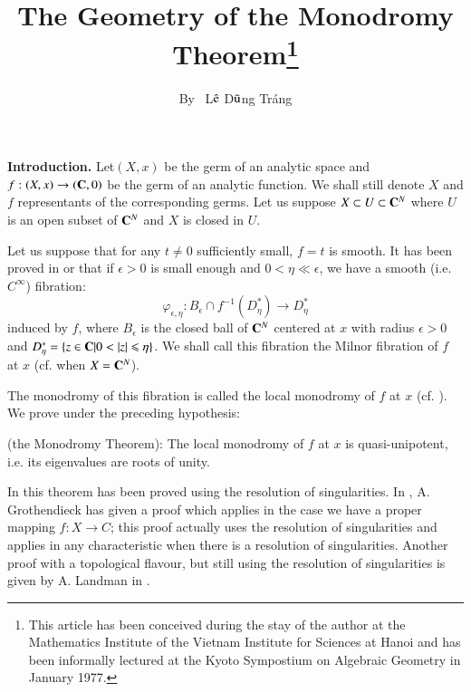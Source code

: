 \title{The Geometry of the Monodromy Theorem\footnote{This article has been conceived during the stay of the author at the Mathematics Institute of the Vietnam Institute for Sciences at Hanoi and has been informally lectured at the Kyoto Sympostium on Algebraic Geometry in January 1977.}}\label{art15}


\author{By~ L$\hat{\rm e}$ D$\tilde{\rm u}$ng Tr\'ang}

\date{}
\maketitle{}

\setcounter{page}{191}

{\bf Introduction.}
\setcounter{pageoriginal}{156} Let\pageoriginale $(X,x)$ be the germ of an analytic space and $f:(X,x) \to (\mathbf{C}, 0)$ be the germ of an analytic function. We shall still denote $X$ and $f$ representants of the corresponding germs. Let us suppose $X \subset U \subset \mathbf{C}^N$ where $U$ is an open subset of $\mathbf{C}^N$ and $X$ is closed in $U$.

Let us suppose that for any $t \neq 0$ sufficiently small, $f = t$ is smooth.  It has been proved in \cite{art15-key3} or \cite{art15-key6} that if $\epsilon > 0$ is small enough and $0< \eta \ll \epsilon$, we have a smooth (i.e. $C^\infty$) fibration:
$$
\varphi_{\epsilon, \eta}: B_\epsilon \cap f^{-1} (D^*_\eta) \to D^*_\eta
$$
induced by $f$, where $B_\epsilon$ is the closed ball of $\mathbf{C}^N$ centered at $x$ with radius $\epsilon>0$ and $D^*_\eta = \{z \in\mathbf{C} |0< |z| \leqslant \eta\}$. We shall call this fibration the Milnor fibration of $f$ at $x$ (cf. \cite{art15-key11}  when $X = \mathbf{C}^N$). 


The monodromy of this fibration is called the local monodromy of $f$ at $x$ (cf. \cite{art15-key6}). We prove under the preceding hypothesis:

\begin{theorem*}{\rm (the Monodromy Theorem):} The local monodromy of $f$ at $x$ is quasi-unipotent, i.e. its eigenvalues are roots of unity.
\end{theorem*}

In \cite{art15-key1} this theorem has been proved using the resolution of singularities. In \cite{art15-key2}, A. Grothendieck has given a proof which applies in the case we have a proper mapping $f: X \to C$; this proof actually uses the resolution of singularities and applies in any characteristic when there is a resolution of singularities. Another proof with a topological flavour, but still using the resolution of singularities is given by A. Landman in \cite{art15-key5}.

